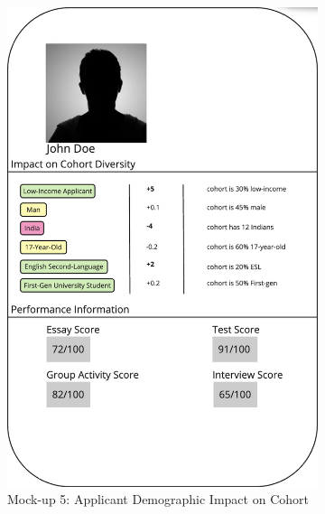 \begin{figure}[htbp]
\begin{subfigure}[b]{0.3\textwidth}
        \includegraphics[width=\textwidth]{figures/codesign/impact.png}
        \caption{Mock-up 5: Applicant Demographic Impact on Cohort}
        \label{fig:impact}
    \end{subfigure}
    \hfill
    \begin{subfigure}[b]{0.3\textwidth}

\end{subfigure}
\end{figure}
